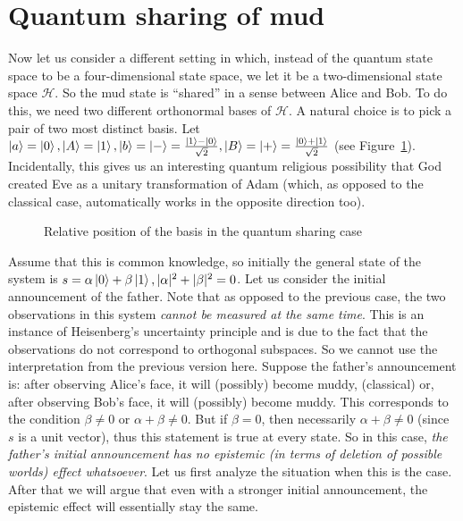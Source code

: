 \documentclass[a4paper]{article}
\newcommand{\HH}{\mathcal{H}}
\begin{document}
\section*{Quantum sharing of mud}
Now let us consider a different setting in which, instead of the quantum state
space to be a four-dimensional state space, we let it be a two-dimensional state
space $\HH$. So the mud state is ``shared'' in a sense between Alice and Bob. To do
this, we need two different orthonormal bases of $\HH$. A natural choice is to
pick a pair of two most distinct basis. Let $\ket{a} = \ket{0}, \ket{A} =
\ket{1}, \ket{b} = \ket{-} = \frac{\ket{1} - \ket{0}}{\sqrt{2}}, \ket{B} =
\ket{+} = \frac{\ket{0} + \ket{1}}{\sqrt{2}}$ (see Figure~\ref{fig:shab}). Incidentally, this gives us an
interesting quantum religious possibility that God created Eve as a unitary
transformation of Adam (which, as opposed to the classical case, automatically
works in the opposite direction too).
\begin{figure}
    \centering
{}
    \caption{Relative position of the basis in the quantum sharing case}
    \label{fig:shab}
\end{figure}
Assume that this is common knowledge, so initially the general state of the
system is $s = \alpha \ket{0} + \beta \ket{1}, |\alpha|^2 + |\beta|^2 = 0$.
Let us consider the initial announcement of the father. Note that as opposed to
the previous case, the two observations in this system \emph{cannot be measured
at the same time}. This is an instance of Heisenberg's uncertainty principle and
is due to the fact that the observations do not correspond to orthogonal
subspaces. So we cannot use the interpretation from the previous version here.
Suppose the father's announcement is: after observing Alice's face, it will
(possibly) become muddy, (classical) or, after observing Bob's face, it will
(possibly) become muddy. This corresponds to the condition $\beta \neq 0$ or 
$\alpha + \beta \neq 0$. But if $\beta = 0$, then necessarily $\alpha + \beta
\neq 0$ (since $s$ is a unit vector), thus this statement is true at every
state. So in this case, \emph{the father's initial announcement has no epistemic
(in terms of deletion of possible worlds) effect whatsoever}. Let us first
analyze the situation when this is the case.  After that we will argue that even
with a stronger initial announcement, the epistemic effect will essentially stay
the same.
\end{document}
